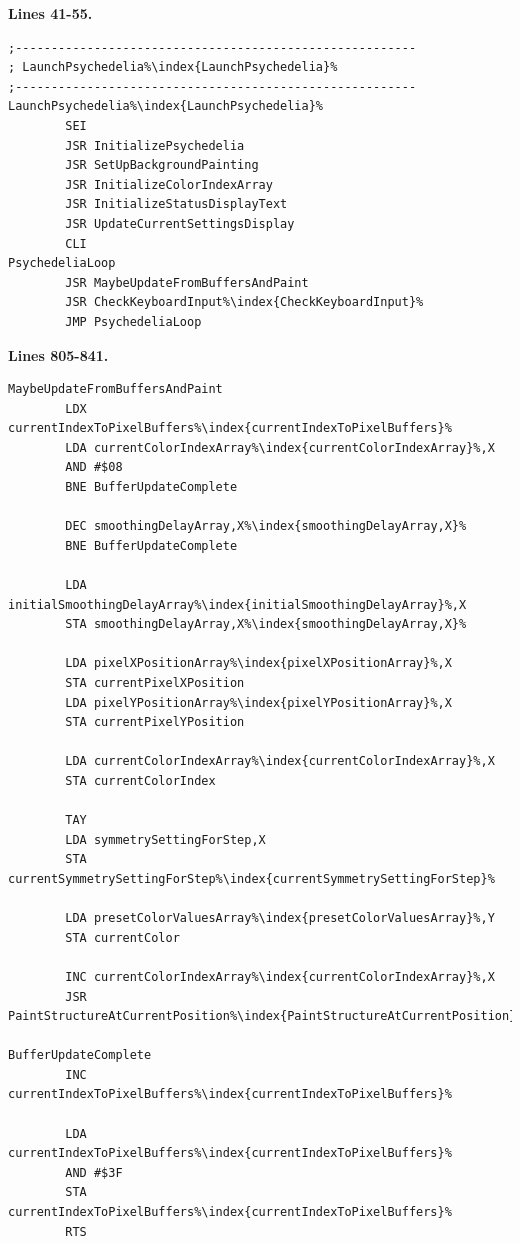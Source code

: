 \clearpage
\textbf{Lines 41-55. } 
\begin{lstlisting}[escapechar=\%]
;--------------------------------------------------------
; LaunchPsychedelia%\index{LaunchPsychedelia}%
;--------------------------------------------------------
LaunchPsychedelia%\index{LaunchPsychedelia}%
        SEI 
        JSR InitializePsychedelia
        JSR SetUpBackgroundPainting
        JSR InitializeColorIndexArray
        JSR InitializeStatusDisplayText
        JSR UpdateCurrentSettingsDisplay
        CLI 
PsychedeliaLoop   
        JSR MaybeUpdateFromBuffersAndPaint
        JSR CheckKeyboardInput%\index{CheckKeyboardInput}%
        JMP PsychedeliaLoop
\end{lstlisting}
\textbf{Lines 805-841. } 
\begin{lstlisting}[basicstyle=\ttfamily\scriptsize, caption=The routine responsible for painting patterns.,escapechar=\%]
MaybeUpdateFromBuffersAndPaint   
        LDX currentIndexToPixelBuffers%\index{currentIndexToPixelBuffers}%
        LDA currentColorIndexArray%\index{currentColorIndexArray}%,X
        AND #$08
        BNE BufferUpdateComplete

        DEC smoothingDelayArray,X%\index{smoothingDelayArray,X}%
        BNE BufferUpdateComplete

        LDA initialSmoothingDelayArray%\index{initialSmoothingDelayArray}%,X
        STA smoothingDelayArray,X%\index{smoothingDelayArray,X}%

        LDA pixelXPositionArray%\index{pixelXPositionArray}%,X
        STA currentPixelXPosition
        LDA pixelYPositionArray%\index{pixelYPositionArray}%,X
        STA currentPixelYPosition

        LDA currentColorIndexArray%\index{currentColorIndexArray}%,X
        STA currentColorIndex

        TAY 
        LDA symmetrySettingForStep,X
        STA currentSymmetrySettingForStep%\index{currentSymmetrySettingForStep}%

        LDA presetColorValuesArray%\index{presetColorValuesArray}%,Y
        STA currentColor

        INC currentColorIndexArray%\index{currentColorIndexArray}%,X
        JSR PaintStructureAtCurrentPosition%\index{PaintStructureAtCurrentPosition}%

BufferUpdateComplete   
        INC currentIndexToPixelBuffers%\index{currentIndexToPixelBuffers}%

        LDA currentIndexToPixelBuffers%\index{currentIndexToPixelBuffers}%
        AND #$3F
        STA currentIndexToPixelBuffers%\index{currentIndexToPixelBuffers}%
        RTS 
\end{lstlisting}
\clearpage

